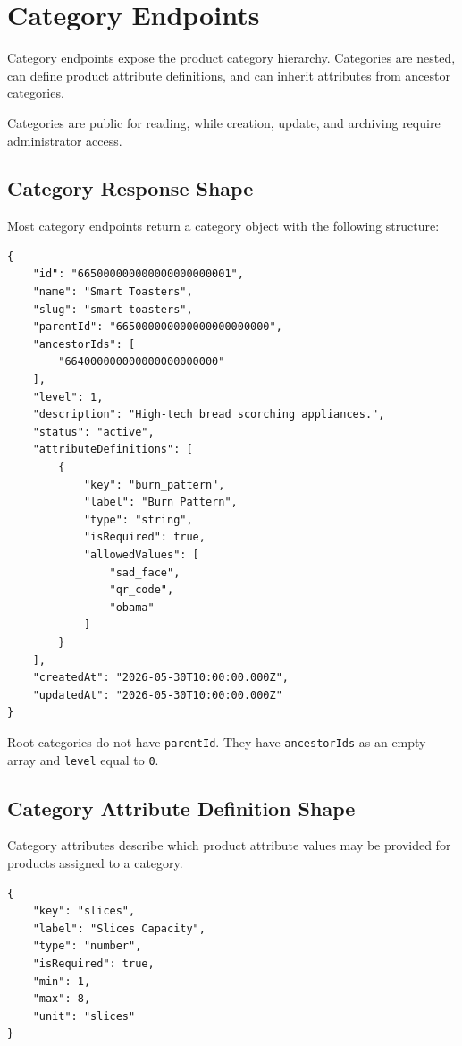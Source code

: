 \section{Category Endpoints}

Category endpoints expose the product category hierarchy. Categories are nested, can define product attribute definitions, and can inherit attributes from ancestor categories.

Categories are public for reading, while creation, update, and archiving require administrator access.

\subsection{Category Response Shape}

Most category endpoints return a category object with the following structure:

\begin{verbatim}
{
    "id": "665000000000000000000001",
    "name": "Smart Toasters",
    "slug": "smart-toasters",
    "parentId": "665000000000000000000000",
    "ancestorIds": [
        "664000000000000000000000"
    ],
    "level": 1,
    "description": "High-tech bread scorching appliances.",
    "status": "active",
    "attributeDefinitions": [
        {
            "key": "burn_pattern",
            "label": "Burn Pattern",
            "type": "string",
            "isRequired": true,
            "allowedValues": [
                "sad_face",
                "qr_code",
                "obama"
            ]
        }
    ],
    "createdAt": "2026-05-30T10:00:00.000Z",
    "updatedAt": "2026-05-30T10:00:00.000Z"
}
\end{verbatim}

Root categories do not have \texttt{parentId}. They have \texttt{ancestorIds} as an empty array and \texttt{level} equal to \texttt{0}.

\pagebreak
\subsection{Category Attribute Definition Shape}

Category attributes describe which product attribute values may be provided for products assigned to a category.

\begin{verbatim}
{
    "key": "slices",
    "label": "Slices Capacity",
    "type": "number",
    "isRequired": true,
    "min": 1,
    "max": 8,
    "unit": "slices"
}
\end{verbatim}

